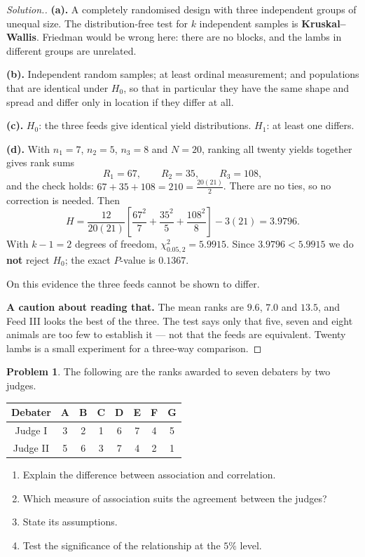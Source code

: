 \documentclass[11pt,a4paper]{article}
\theoremstyle{definition}
\newtheorem{problemx}{Problem}[section]
\newenvironment{problem}{\begin{problemx}}{\end{problemx}}
\newenvironment{solution}
  {\renewcommand{\qedsymbol}{}\begin{proof}[\textit{Solution}.]}
  {\end{proof}}
\begin{document}
\begin{solution}
\textbf{(a).} A completely randomised design with three independent groups of
unequal size. The distribution-free test for $k$ independent samples is
\textbf{Kruskal--Wallis}. Friedman would be wrong here: there are no blocks, and
the lambs in different groups are unrelated.

\textbf{(b).} Independent random samples; at least ordinal measurement; and
populations that are identical under $H_0$, so that in particular they have the
same shape and spread and differ only in location if they differ at all.

\textbf{(c).} $H_0$: the three feeds give identical yield distributions.
$H_1$: at least one differs.

\textbf{(d).} With $n_1 = 7$, $n_2 = 5$, $n_3 = 8$ and $N = 20$, ranking all
twenty yields together gives rank sums
$$R_1 = 67,\qquad R_2 = 35,\qquad R_3 = 108,$$
and the check holds: $67 + 35 + 108 = 210 = \frac{20(21)}{2}$. There are no ties,
so no correction is needed. Then
$$H = \dfrac{12}{20(21)}\left[\dfrac{67^{2}}{7} + \dfrac{35^{2}}{5}
+ \dfrac{108^{2}}{8}\right] - 3(21) = 3.9796 .$$
With $k - 1 = 2$ degrees of freedom, $\chi^{2}_{0.05,2} = 5.9915$. Since
$3.9796 < 5.9915$ we do \textbf{not} reject $H_0$; the exact $P$-value is
$0.1367$.

On this evidence the three feeds cannot be shown to differ.

\textbf{A caution about reading that.} The mean ranks are $9.6$, $7.0$ and $13.5$,
and Feed III looks the best of the three. The test says only that five, seven and
eight animals are too few to establish it --- not that the feeds are equivalent.
Twenty lambs is a small experiment for a three-way comparison.
\end{solution}

\begin{problem}
The following are the ranks awarded to seven debaters by two judges.
\begin{center}
\begin{tabular}{c|ccccccc}
\hline
Debater & A & B & C & D & E & F & G\\
\hline
Judge I & 3 & 2 & 1 & 6 & 7 & 4 & 5\\
Judge II & 5 & 6 & 3 & 7 & 4 & 2 & 1\\
\hline
\end{tabular}
\end{center}
\begin{enumerate}
\item[(a).] Explain the difference between association and correlation.
\item[(b).] Which measure of association suits the agreement between the judges?
\item[(c).] State its assumptions.
\item[(d).] Test the significance of the relationship at the $5\%$ level.
\end{enumerate}
\end{problem}
\end{document}

